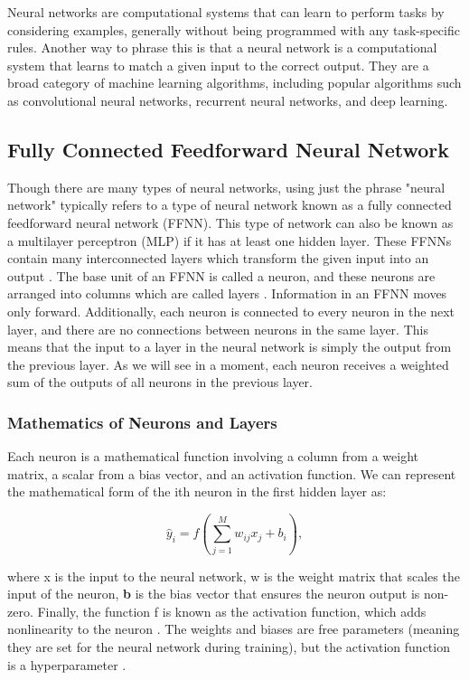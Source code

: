 Neural networks are computational systems that can learn to perform tasks by considering examples, generally without being programmed with any task-specific rules. Another way to phrase this is that a neural network is a computational system that learns to match a given input to the correct output. They are a broad category of machine learning algorithms, including popular algorithms such as convolutional neural networks, recurrent neural networks, and deep learning.

\subsection*{Fully Connected Feedforward Neural Network}

	Though there are many types of neural networks, using just the phrase "neural network" typically refers to a type of neural network known as a fully connected feedforward neural network (FFNN). This type of network can also be known as a multilayer perceptron (MLP) if it has at least one hidden layer. These FFNNs contain many interconnected layers which transform the given input into an output \cite{Ref6}. The base unit of an FFNN is called a neuron, and these neurons are arranged into columns which are called layers \cite{Ref6}. Information in an FFNN moves only forward.
Additionally, each neuron is connected to every neuron in the next layer, and there are no connections between neurons in the same layer. This means that the input to a layer in the neural network is simply the output from the previous layer. As we will see in a moment, each neuron receives a weighted sum of the outputs of all neurons in the previous layer.

		\subsubsection{Mathematics of Neurons and Layers}

		Each neuron is a mathematical function involving a column from a weight matrix, a scalar from a bias vector, and an activation function. We can represent the mathematical form of the ith neuron in the first hidden layer as:

		\begin{equation} \label{neuron}
			\hat{y}_i = f(\sum_{j=1}^M w_{ij}x_j + b_i),
		\end{equation}


		where x is the input to the neural network, w is the weight matrix that scales the input of the neuron, \textbf{b} is the bias vector that ensures the neuron output is non-zero. Finally, the function f is known as the activation function, which adds nonlinearity to the neuron \cite{Ref6}. The weights and biases are free parameters (meaning they are set for the neural network during training), but the activation function is a hyperparameter \cite{Ref6}.


